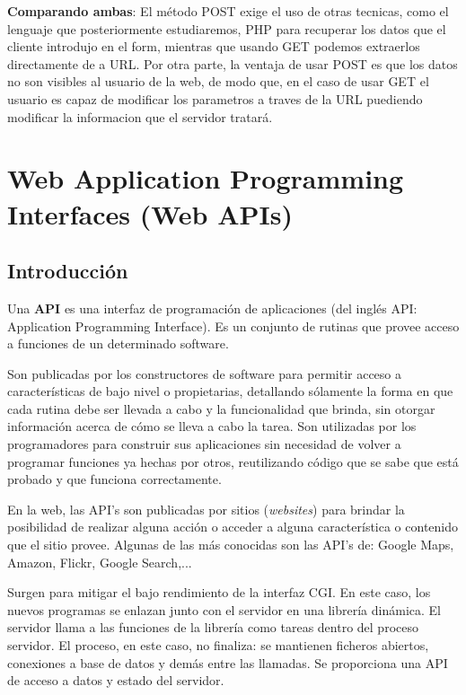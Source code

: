 \documentclass{apuntes}
\begin{document}
\textbf{Comparando ambas}: El método POST exige el uso de otras tecnicas, como el lenguaje que posteriormente estudiaremos, PHP para recuperar los datos que el cliente introdujo en el form, mientras que usando GET podemos extraerlos directamente de a URL. Por otra parte, la ventaja de usar POST es que los datos no son visibles al usuario de la web, de modo que, en el caso de usar GET el usuario es capaz de modificar los parametros a traves de la URL puediendo modificar la informacion que el servidor tratará.

\section{Web Application Programming Interfaces (Web APIs)}
\subsection{Introducción}
\begin{defn}[API]
Una \textbf{API} es una interfaz de programación de aplicaciones (del inglés API: Application Programming Interface). Es un conjunto de rutinas que provee acceso a funciones de un determinado software.
\end{defn}

Son publicadas por los constructores de software para permitir acceso a características de bajo nivel o propietarias, detallando sólamente la forma en que cada rutina debe ser llevada a cabo y la funcionalidad que brinda, sin otorgar información acerca de cómo se lleva a cabo la tarea. Son utilizadas por los programadores para construir sus aplicaciones sin necesidad de volver a programar funciones ya hechas por otros, reutilizando código que se sabe que está probado y que funciona correctamente.

En la web, las API's son publicadas por sitios (\emph{websites}) para brindar la posibilidad de realizar alguna acción o acceder a alguna característica o contenido que el sitio provee. Algunas de las más conocidas son las API's de: Google Maps, Amazon, Flickr, Google Search,...

Surgen para mitigar el bajo rendimiento de la interfaz CGI. En este caso, los nuevos programas se enlazan junto con el servidor en una librería dinámica. El servidor llama a las funciones de la librería como tareas dentro del proceso servidor. El proceso, en este caso, no finaliza: se mantienen ficheros abiertos, conexiones a base de datos y demás entre las llamadas. Se proporciona una API de acceso a datos y estado del servidor.
\end{document}
